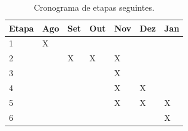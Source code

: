 \begin{table}[ht]
\centering
\begin{tabular}{|l|l|l|l|l|l|l|}
\hline
\multicolumn{1}{|c|}{Etapa} & Ago & Set & Out & Nov & Dez & Jan \\ \hline
1                           & X   &     &     &     &     &     \\ \hline
2                           &     & X   & X   & X   &     &     \\ \hline
3                           &     &     &     & X   &     &     \\ \hline
4                           &     &     &     & X   & X   &     \\ \hline
5                           &     &     &     & X   & X   & X   \\ \hline
6                           &     &     &     &     &     & X   \\ \hline
\end{tabular}
\caption{Cronograma de etapas seguintes.}
\label{table:cronograma}
\end{table}